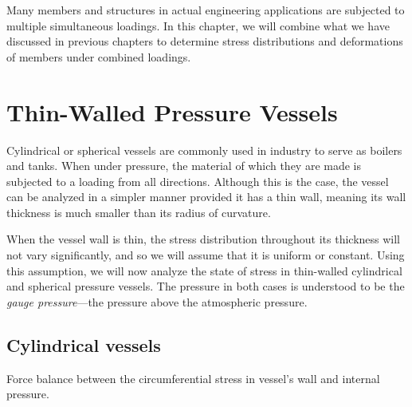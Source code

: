 \documentclass[
fontsize=10pt,
a4paper,
twosides=false,
open=any,
svgnames,
]{kaobook} %
\begin{document}
Many members and structures in actual engineering applications are subjected to multiple simultaneous loadings. In this chapter, we will combine what we have discussed in previous chapters to determine stress distributions and deformations of members under combined loadings.

\section{Thin-Walled Pressure Vessels}

Cylindrical or spherical vessels are commonly used in industry to serve as boilers and tanks. When under pressure, the material of which they are made is subjected to a loading from all directions. Although this is the case, the vessel can be analyzed in a simpler manner provided it has a thin wall, meaning its wall thickness is much smaller than its radius of curvature.

When the vessel wall is thin, the stress distribution throughout its thickness will not vary significantly, and so we will assume that it is uniform or constant. Using this assumption, we will now analyze the state of stress in thin-walled cylindrical and spherical pressure vessels. The pressure in both cases is understood to be the \emph{gauge pressure}—the pressure above the atmospheric pressure.

\subsection{Cylindrical vessels}

\begin{marginfigure}
  \centering
  \caption{Force balance between the circumferential stress in vessel's wall and internal pressure.}
  \label{fig: cylindrical vessel circumferential}
\end{marginfigure}
\end{document}
